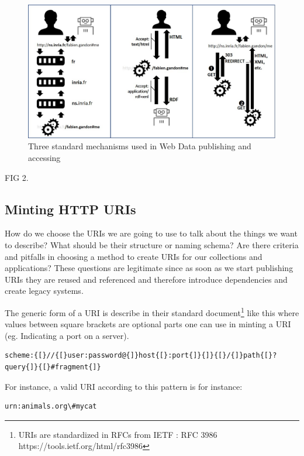 \begin{figure}
    \centering
        \includegraphics[width=5.0in]{media/figure-05-02.jpg}
    \caption{Three standard mechanisms used in Web Data publishing and
accessing}
    \label{fig:ch5.2}
\end{figure}

FIG 2. 

\hypertarget{minting-http-uris}{%
\subsection{Minting HTTP URIs}\label{minting-http-uris}}

How do we choose the URIs we are going to use to talk about the things
we want to describe? What should be their structure or naming schema?
Are there criteria and pitfalls in choosing a method to create URIs for
our collections and applications? These questions are legitimate since
as soon as we start publishing URIs they are reused and referenced and
therefore introduce dependencies and create legacy systems.

The generic form of a URI is describe in their standard
document\footnote{URIs are standardized in RFCs from IETF : RFC 3986
  https://tools.ietf.org/html/rfc3986} like this where values between
square brackets are optional parts one can use in minting a URI (eg.
Indicating a port on a server).

\begin{lstlisting}
scheme:{[}//{[}user:password@{]}host{[}:port{]}{]}{[}/{]}path{[}?query{]}{[}#fragment{]}
\end{lstlisting}

For instance, a valid URI according to this pattern is for instance:

\begin{lstlisting}
urn:animals.org\#mycat
\end{lstlisting}


